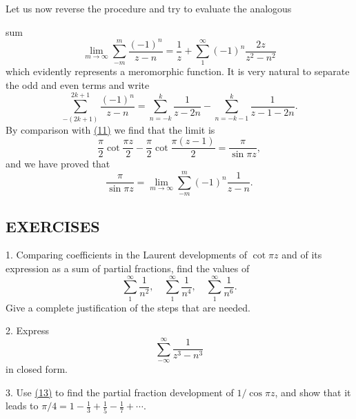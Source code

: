 Let us now reverse the procedure and try to evaluate the analogous


sum
\begin{equation*}
\lim _ {m \rightarrow \infty} \sum_ {- m} ^ {m} \frac {(- 1) ^ {n}}{z - n} = \frac {1}{z} + \sum_ {1} ^ {\infty} (- 1) ^ {n} \frac {2 z}{z ^ {2} - n ^ {2}}\tag{12}\label{eq:5.12}
\end{equation*}
which evidently represents a meromorphic function. It is very natural to separate the odd and even terms and write
\begin{equation*}
\sum_ {- (2 k + 1)} ^ {2 k + 1} \frac {(- 1) ^ {n}}{z - n} = \sum_ {n = - k} ^ {k} \frac {1}{z - 2 n} - \sum_ {n = - k - 1} ^ {k} \frac {1}{z - 1 - 2 n}.
\end{equation*}
By comparison with \hyperref[eq:5.11]{(11)} we find that the limit is
\begin{equation*}
\frac {\pi}{2} \cot \frac {\pi z}{2} - \frac {\pi}{2} \cot \frac {\pi (z - 1)}{2} = \frac {\pi}{\sin \pi z},
\end{equation*}
and we have proved that
\begin{equation*}
\frac {\pi}{\sin \pi z} = \lim _ {m \rightarrow \infty} \sum_ {- m} ^ {m} (- 1) ^ {n} \frac {1}{z - n}.\tag{13}\label{eq:5.13}
\end{equation*}
\subsection*{EXERCISES}
1. Comparing coefficients in the Laurent developments of $\cot \pi z$ and of its expression as a sum of partial fractions, find the values of
\begin{equation*}
\sum_ {1} ^ {\infty} \frac {1}{n ^ {2}}, \quad \sum_ {1} ^ {\infty} \frac {1}{n ^ {4}}, \quad \sum_ {1} ^ {\infty} \frac {1}{n ^ {6}}.
\end{equation*}
Give a complete justification of the steps that are needed.

2. Express
\begin{equation*}
\sum_ {- \infty} ^ {\infty} \frac {1}{z ^ {3} - n ^ {3}}
\end{equation*}
in closed form.

3. Use \hyperref[eq:5.13]{(13)} to find the partial fraction development of $1/\cos \pi z$, and show that it leads to $\pi/4 = 1 - \frac{1}{3} + \frac{1}{5} - \frac{1}{7} + \cdots$.

